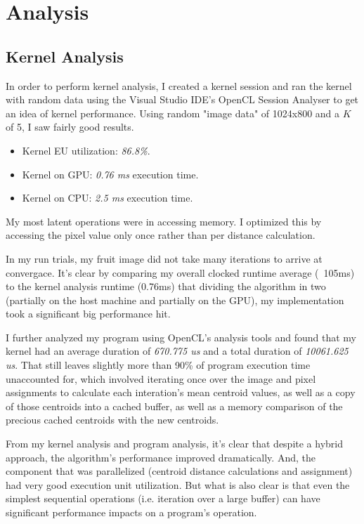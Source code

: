 \documentclass[11pt]{article}
\begin{document}
\section{Analysis}

\subsection{Kernel Analysis}

In order to perform kernel analysis, I created a kernel session and ran the kernel with random
data using the Visual Studio IDE's OpenCL Session Analyser to get an idea of kernel performance.
Using random "image data" of 1024x800 and a $K$ of 5, I saw fairly good results.

\begin{itemize}
\item Kernel EU utilization: \emph{86.8\%}.
\item Kernel on GPU: \emph{0.76 ms} execution time.
\item Kernel on CPU: \emph{2.5 ms} execution time.
\end{itemize}

My most latent operations were in accessing memory. I optimized this by accessing the pixel value
only once rather than per distance calculation.

In my run trials, my fruit image did not take many iterations to arrive at convergace. It's clear
by comparing my overall clocked runtime average (~105ms) to the kernel analysis runtime (0.76ms)
that dividing the algorithm in two (partially on the host machine and partially on the GPU), my
implementation took a significant big performance hit.

I further analyzed my program using OpenCL's analysis tools and found that my kernel had an
average duration of \emph{670.775 us} and a total duration of \emph{10061.625 us}. That still
leaves slightly more than 90\% of program execution time unaccounted for, which involved
iterating once over the image and pixel assignments to calculate each interation's mean centroid
values, as well as a copy of those centroids into a cached buffer, as well as a memory comparison
of the precious cached centroids with the new centroids.

From my kernel analysis and program analysis, it's clear that despite a hybrid approach, the
algorithm's performance improved dramatically. And, the component that was parallelized (centroid
distance calculations and assignment) had very good execution unit utilization. But what is also
clear is that even the simplest sequential operations (i.e. iteration over a large buffer) can have
significant performance impacts on a program's operation.
\end{document}
